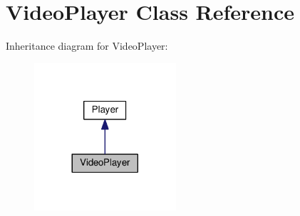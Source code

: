 \hypertarget{classGUI_1_1VideoPlayer}{}\section{Video\+Player Class Reference}
\label{classGUI_1_1VideoPlayer}


Inheritance diagram for Video\+Player\+:
\nopagebreak
\begin{figure}[H]
\begin{center}
\leavevmode
\includegraphics[width=149pt]{classGUI_1_1VideoPlayer__inherit__graph}
\end{center}
\end{figure}
